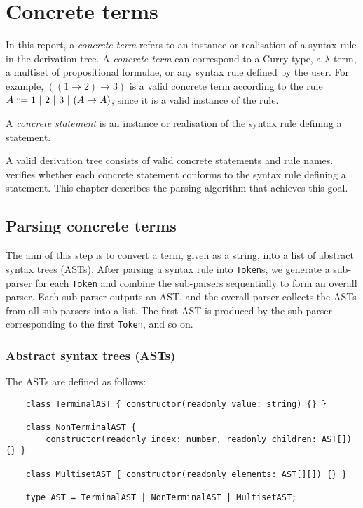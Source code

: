 \section{Concrete terms}
\label{section:term}
In this report, a \textit{concrete term} refers to an instance or realisation of a syntax rule in the derivation tree. A \textit{concrete term} can correspond to a Curry type, a $\lambda$-term, a multiset of propositional formulae, or any syntax rule defined by the user. For example, $((1 \to 2) \to 3)$ is a valid concrete term according to the rule $A \Coloneqq 1 \ |\  2 \ |\  3 \ |\  (A \to A)$, since it is a valid instance of the rule.

A \textit{concrete statement} is an instance or realisation of the syntax rule defining a statement.

A valid derivation tree consists of valid concrete statements and rule names. \projectname{} verifies whether each concrete statement conforms to the syntax rule defining a statement. This chapter describes the parsing algorithm that achieves this goal.

\subsection{Parsing concrete terms}
The aim of this step is to convert a term, given as a string, into a list of abstract syntax trees (ASTs). After parsing a syntax rule into \lstinline{Token}s, we generate a sub-parser for each \lstinline{Token} and combine the sub-parsers sequentially to form an overall parser. Each sub-parser outputs an AST, and the overall parser collects the ASTs from all sub-parsers into a list. The first AST is produced by the sub-parser corresponding to the first \lstinline{Token}, and so on.

\subsubsection{Abstract syntax trees (ASTs)}
The ASTs are defined as follows:
\begin{lstlisting}
    class TerminalAST { constructor(readonly value: string) {} }

    class NonTerminalAST {
        constructor(readonly index: number, readonly children: AST[]) {} }

    class MultisetAST { constructor(readonly elements: AST[][]) {} }

    type AST = TerminalAST | NonTerminalAST | MultisetAST;
\end{lstlisting}

